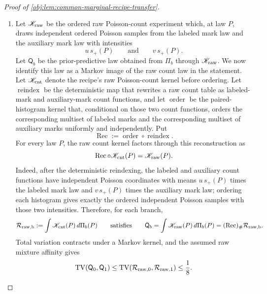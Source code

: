 \begin{proof}[Proof of \cref{obj:lem:common-marginal-recipe-transfer}]
\begin{enumerate}
\item Let \(\mathscr K_{\rm raw}\) be the ordered raw Poisson-count experiment which, at law \(P\), draws independent ordered Poisson samples from the labeled mark law and the auxiliary mark law with intensities
\[
u\,s_+(P)
\qquad\text{and}\qquad
v\,s_+(P).
\]
Let \(\mathsf Q_b\) be the prior-predictive law obtained from \(\Pi_b\) through \(\mathscr K_{\rm raw}\).  We now identify this law as a Markov image of the raw count law in the statement.  Let \(\mathscr K_{\rm cnt}\) denote the recipe's raw Poisson-count kernel before ordering.  Let \(\operatorname{reindex}\) be the deterministic map that rewrites a raw count table as labeled-mark and auxiliary-mark count functions, and let \(\operatorname{order}\) be the paired-histogram kernel that, conditional on those two count functions, orders the corresponding multiset of labeled marks and the corresponding multiset of auxiliary marks uniformly and independently.  Put
\[
\operatorname{Rec}:=\operatorname{order}\circ\operatorname{reindex} .
\]
For every law \(P\), the raw count kernel factors through this reconstruction as
\[
\operatorname{Rec}\circ \mathscr K_{\rm cnt}(P)
=
\mathscr K_{\rm raw}(P).
\]
Indeed, after the deterministic reindexing, the labeled and auxiliary count functions have independent Poisson coordinates with means \(u\,s_+(P)\) times the labeled mark law and \(v\,s_+(P)\) times the auxiliary mark law; ordering each histogram gives exactly the ordered independent Poisson samples with those two intensities.  Therefore, for each branch,
\[
\mathcal R_{\rm raw,b}
:=\int \mathscr K_{\rm cnt}(P)\,d\Pi_b(P)
\qquad\text{satisfies}\qquad
\mathsf Q_b
=\int \mathscr K_{\rm raw}(P)\,d\Pi_b(P)
=(\operatorname{Rec})_{\#}\mathcal R_{\rm raw,b}.
\]
Total variation contracts under a Markov kernel, and the assumed raw mixture affinity gives
\[
\operatorname{TV}(\mathsf Q_0,\mathsf Q_1)
\le
\operatorname{TV}(\mathcal R_{\rm raw,0},\mathcal R_{\rm raw,1})
\le \frac18 .
\] %


\end{enumerate}
\end{proof}
